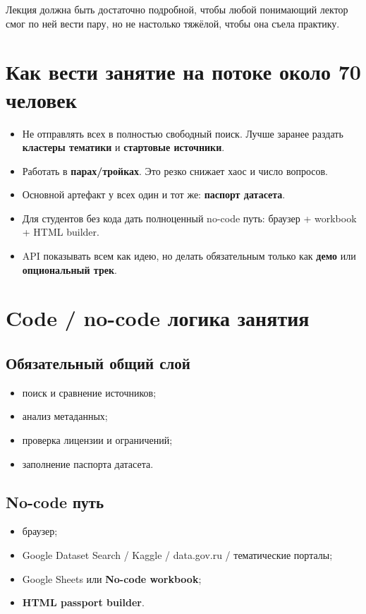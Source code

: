 \documentclass[11pt,a4paper]{article}
\begin{document}
Лекция должна быть достаточно подробной, чтобы любой понимающий лектор смог по ней вести пару, но не настолько тяжёлой, чтобы она съела практику.

\section{Как вести занятие на потоке около 70 человек}

\begin{itemize}[leftmargin=1.2em]
\item Не отправлять всех в полностью свободный поиск. Лучше заранее раздать \textbf{кластеры тематики} и \textbf{стартовые источники}.
\item Работать в \textbf{парах/тройках}. Это резко снижает хаос и число вопросов.
\item Основной артефакт у всех один и тот же: \textbf{паспорт датасета}.
\item Для студентов без кода дать полноценный no-code путь: браузер + workbook + HTML builder.
\item API показывать всем как идею, но делать обязательным только как \textbf{демо} или \textbf{опциональный трек}.
\end{itemize}

\section{Code / no-code логика занятия}

\subsection{Обязательный общий слой}
\begin{itemize}[leftmargin=1.2em]
\item поиск и сравнение источников;
\item анализ метаданных;
\item проверка лицензии и ограничений;
\item заполнение паспорта датасета.
\end{itemize}

\subsection{No-code путь}
\begin{itemize}[leftmargin=1.2em]
\item браузер;
\item Google Dataset Search / Kaggle / data.gov.ru / тематические порталы;
\item Google Sheets или \textbf{No-code workbook};
\item \textbf{HTML passport builder}.
\end{itemize}
\end{document}

